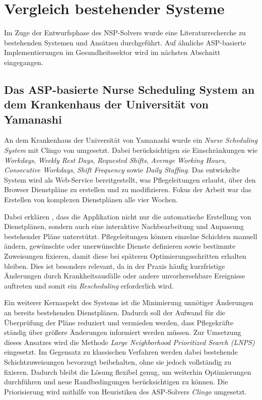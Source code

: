 
\chapter{Vergleich bestehender Systeme}
\label{sec:related_work}
Im Zuge der Entwurfsphase des NSP-Solvers wurde eine Literaturrecherche zu bestehenden 
Systemen und Ansätzen durchgeführt. Auf ähnliche ASP-basierte Implementierungen im Gesundheitssektor wird im nächsten Abschnitt eingegangen.

\section{Das ASP-basierte Nurse Scheduling System an dem Krankenhaus der Universität von Yamanashi}
An dem Krankenhaus der Universität von Yamanashi wurde ein \textit{Nurse Scheduling System} mit Clingo von \textcite{nabeshimaASPbasedNurseScheduling2026} umgesetzt. Dabei berücksichtigen sie Einschränkungen wie \textit{Workdays}, \textit{Weekly Rest Days}, \textit{Requested Shifts}, \textit{Average Working Hours}, \textit{Consecutive Workdays}, \textit{Shift Frequency} sowie \textit{Daily Staffing}. Das entwickelte System wird als Web-Service bereitgestellt, was Pflegeleitungen erlaubt, über den Browser Dienstpläne zu erstellen und zu modifizieren. Fokus der Arbeit war das Erstellen von komplexen Dienstplänen alle vier Wochen.

Dabei erklären \textcite{nabeshimaASPbasedNurseScheduling2026}, dass die Applikation nicht nur die automatische Erstellung von Dienstplänen, sondern auch eine interaktive Nachbearbeitung und Anpassung bestehender Pläne unterstützt. Pflegeleitungen können einzelne Schichten manuell ändern, gewünschte oder unerwünschte Dienste definieren sowie bestimmte Zuweisungen fixieren, damit diese bei späteren Optimierungsschritten erhalten bleiben. Dies ist besonders relevant, da in der Praxis häufig kurzfristige Änderungen durch Krankheitsausfälle oder andere unvorhersehbare Ereignisse auftreten und somit ein \textit{Rescheduling} erforderlich wird.

Ein weiterer Kernaspekt des Systems ist die Minimierung unnötiger Änderungen an bereits bestehenden Dienstplänen. Dadurch soll der Aufwand für die Überprüfung der Pläne reduziert und vermieden werden, dass Pflegekräfte ständig über größere Änderungen informiert werden müssen. Zur Umsetzung dieses Ansatzes wird die Methode \textit{Large Neighborhood Prioritized Search (LNPS)} eingesetzt. Im Gegensatz zu klassischen Verfahren werden dabei bestehende Schichtzuweisungen bevorzugt beibehalten, ohne sie jedoch vollständig zu fixieren. Dadurch bleibt die Lösung flexibel genug, um weiterhin Optimierungen durchführen und neue Randbedingungen berücksichtigen zu können. Die Priorisierung wird mithilfe von Heuristiken des ASP-Solvers \textit{Clingo} umgesetzt.


